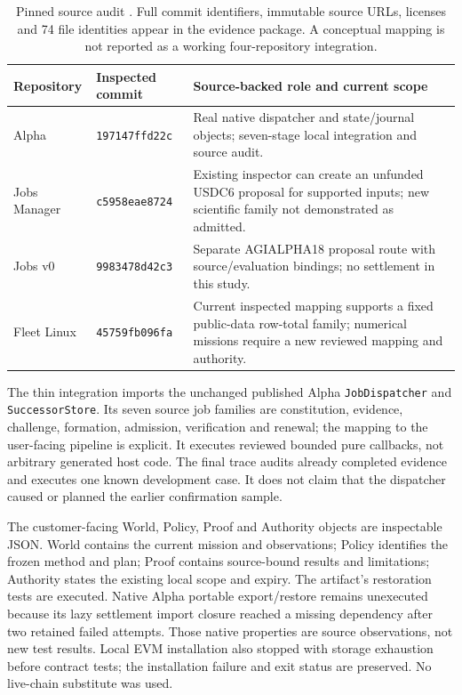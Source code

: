 \documentclass[11pt,letterpaper]{article}
\newcommand{\code}[1]{\texttt{\small #1}}
\begin{document}
\begin{table}[htbp]
\centering\small
\begin{tabularx}{\linewidth}{@{}p{.20\linewidth}p{.21\linewidth}X@{}}
\toprule
\textbf{Repository} & \textbf{Inspected commit} & \textbf{Source-backed role and current scope}\\
\midrule
Alpha & \texttt{197147ffd22c} & Real native dispatcher and state/journal objects; seven-stage local integration and source audit.\\
Jobs Manager & \texttt{c5958eae8724} & Existing inspector can create an unfunded USDC6 proposal for supported inputs; new scientific family not demonstrated as admitted.\\
Jobs v0 & \texttt{9983478d42c3} & Separate AGIALPHA18 proposal route with source/evaluation bindings; no settlement in this study.\\
Fleet Linux & \texttt{45759fb096fa} & Current inspected mapping supports a fixed public-data row-total family; numerical missions require a new reviewed mapping and authority.\\
\bottomrule
\end{tabularx}
\caption{Pinned source audit \citep{alpha2026source,manager2026source,jobs2026source,fleet2026source}. Full commit identifiers, immutable source URLs, licenses and 74 file identities appear in the evidence package. A conceptual mapping is not reported as a working four-repository integration.}
\end{table}

The thin integration imports the unchanged published Alpha \code{JobDispatcher} and \code{SuccessorStore}. Its seven source job families are constitution, evidence, challenge, formation, admission, verification and renewal; the mapping to the user-facing pipeline is explicit. It executes reviewed bounded pure callbacks, not arbitrary generated host code. The final trace audits already completed evidence and executes one known development case. It does not claim that the dispatcher caused or planned the earlier confirmation sample.

The customer-facing World, Policy, Proof and Authority objects are inspectable JSON. World contains the current mission and observations; Policy identifies the frozen method and plan; Proof contains source-bound results and limitations; Authority states the existing local scope and expiry. The artifact's restoration tests are executed. Native Alpha portable export/restore remains unexecuted because its lazy settlement import closure reached a missing dependency after two retained failed attempts. Those native properties are source observations, not new test results. Local EVM installation also stopped with storage exhaustion before contract tests; the installation failure and exit status are preserved. No live-chain substitute was used.
\end{document}
